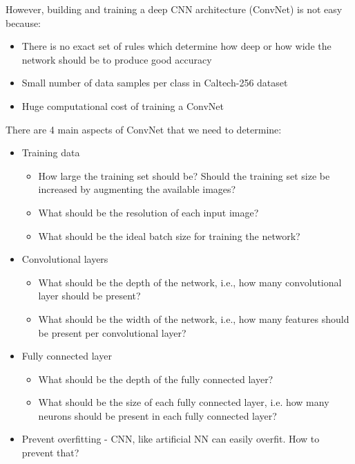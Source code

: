 \documentclass{article} %
\begin{document}
\par However, building and training a deep CNN architecture (ConvNet) is not easy because:

\begin{itemize}
\item
There is no exact set of rules which determine how deep or how wide the network should be to produce good accuracy
\item
Small number of data samples per class in Caltech-256 dataset
\item
Huge computational cost of training a ConvNet
\end{itemize}

There are 4 main aspects of ConvNet that we need to determine:

\begin{itemize}
\item
Training data 
	\begin{itemize}
		\item
		How large the training set should be? Should the training set size be increased by augmenting the available images?
		\item
		What should be the resolution of each input image? 
		\item
		What should be the ideal batch size for training the network? 
	\end{itemize}	

\item
Convolutional layers
	\begin{itemize}
		\item
		What should be the depth of the network, i.e., how many convolutional layer should be present?
		\item
		What should be the width of the network, i.e., how many features should be present per convolutional layer?
	\end{itemize}

\item
Fully connected layer
	\begin{itemize}
		\item 
		What should be the depth of the fully connected layer?
		\item
		What should be the size of each fully connected layer, i.e. how many neurons should be present in each fully connected layer?
	\end{itemize}

\item
Prevent overfitting - CNN, like artificial NN can easily overfit. How to prevent that? 
\end{itemize} 
\end{document}
